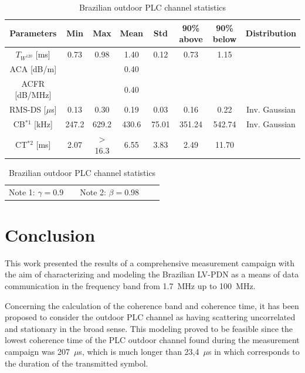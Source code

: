 \documentclass[journal]{IEEEtran}
\begin{document}
\begin{table}[!htb]
\centering
\caption{Brazilian outdoor PLC channel statistics}
\begin{tabular}{c|c|c|c|c|c|c|c}
\hline 
Parameters           & Min    & Max    & Mean     & Std     & 90\% above    & 90\% below & Distribution\\
\hline
$T_{W^{120}}$ [ms]   & 0.73   & 0.98   &  1.40    & 0.12    &  0.73         & 1.15       & \\
\hline
ACA [dB/m]          &        &        &  0.40    &         &               &            & \\
\hline
ACFR [dB/MHz]        &        &        &  0.40    &         &               &            & \\
\hline
RMS-DS [$\mu$s]      & 0.13   & 0.30   & 0.19     & 0.03    & 0.16          & 0.22       & Inv. Gaussian\\
\hline
CB$^{*1}$ [kHz]      & 247.2  & 629.2  & 430.6    & 75.01   & 351.24        & 542.74     & Inv. Gaussian\\
\hline
CT$^{*2}$ [ms]       & 2.07   & $>$16.3  & 6.55     & 3.83    & 2.49          & 11.70      & \\
\hline 
\end{tabular} \label{Tab:Estatisticas}
\newline
\begin{tabular}{ccccc}
Note 1: $\gamma = 0.9$ &  &Note 2: $\beta=0.98$ & & \\  
\end{tabular}
\end{table}


\section{Conclusion}\label{sec-conclusao}
This work presented the results of a comprehensive measurement campaign with the aim of characterizing and modeling the Brazilian \ac{LV-PDN} as a means of data communication in the frequency band from 1.7~MHz up to 100~MHz.

Concerning the calculation of the coherence band and coherence time, it has been proposed to consider the outdoor \ac{PLC} channel as having scattering uncorrelated and stationary in the broad sense. This modeling proved to be feasible since the lowest coherence time of the \ac{PLC} outdoor channel found during the measurement campaign was 207~$\mu$s, which is much longer than 23,4~$\mu$s in which corresponds to the duration of the transmitted symbol. 
\end{document}
